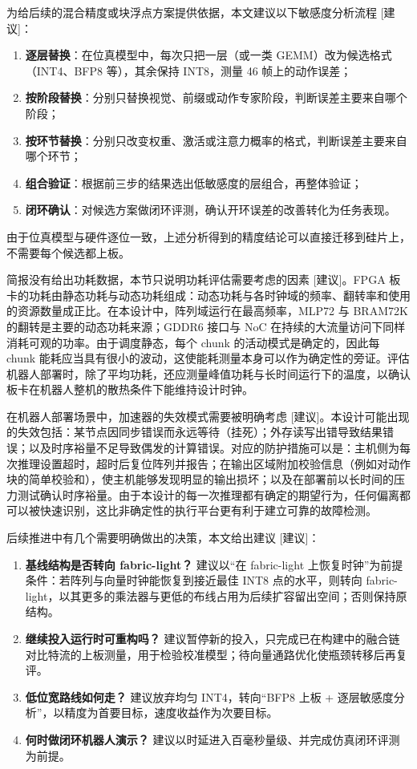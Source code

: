 \documentclass[a4paper,10.5pt]{ctexart}
\newcommand{\tR}{\textsf{[建议]}}           %
\begin{document}
为给后续的混合精度或块浮点方案提供依据，本文建议以下敏感度分析流程 \tR：
\begin{enumerate}
  \item \textbf{逐层替换}：在位真模型中，每次只把一层（或一类 GEMM）改为候选格式（INT4、BFP8 等），其余保持 INT8，测量 46 帧上的动作误差；
  \item \textbf{按阶段替换}：分别只替换视觉、前缀或动作专家阶段，判断误差主要来自哪个阶段；
  \item \textbf{按环节替换}：分别只改变权重、激活或注意力概率的格式，判断误差主要来自哪个环节；
  \item \textbf{组合验证}：根据前三步的结果选出低敏感度的层组合，再整体验证；
  \item \textbf{闭环确认}：对候选方案做闭环评测，确认开环误差的改善转化为任务表现。
\end{enumerate}
由于位真模型与硬件逐位一致，上述分析得到的精度结论可以直接迁移到硅片上，不需要每个候选都上板。

简报没有给出功耗数据，本节只说明功耗评估需要考虑的因素 \tR。FPGA 板卡的功耗由静态功耗与动态功耗组成：动态功耗与各时钟域的频率、翻转率和使用的资源数量成正比。在本设计中，阵列域运行在最高频率，MLP72 与 BRAM72K 的翻转是主要的动态功耗来源；GDDR6 接口与 NoC 在持续的大流量访问下同样消耗可观的功率。由于调度静态，每个 chunk 的活动模式是确定的，因此每 chunk 能耗应当具有很小的波动，这使能耗测量本身可以作为确定性的旁证。评估机器人部署时，除了平均功耗，还应测量峰值功耗与长时间运行下的温度，以确认板卡在机器人整机的散热条件下能维持设计时钟。

在机器人部署场景中，加速器的失效模式需要被明确考虑 \tR。本设计可能出现的失效包括：某节点因同步错误而永远等待（挂死）；外存读写出错导致结果错误；以及时序裕量不足导致偶发的计算错误。对应的防护措施可以是：主机侧为每次推理设置超时，超时后复位阵列并报告；在输出区域附加校验信息（例如对动作块的简单校验和），使主机能够发现明显的输出损坏；以及在部署前以长时间的压力测试确认时序裕量。由于本设计的每一次推理都有确定的期望行为，任何偏离都可以被快速识别，这比非确定性的执行平台更有利于建立可靠的故障检测。

后续推进中有几个需要明确做出的决策，本文给出建议 \tR：
\begin{enumerate}
  \item \textbf{基线结构是否转向 fabric-light？} 建议以“在 fabric-light 上恢复时钟”为前提条件：若阵列与向量时钟能恢复到接近最佳 INT8 点的水平，则转向 fabric-light，以其更多的乘法器与更低的布线占用为后续扩容留出空间；否则保持原结构。
  \item \textbf{继续投入运行时可重构吗？} 建议暂停新的投入，只完成已在构建中的融合链对比特流的上板测量，用于检验校准模型；待向量通路优化使瓶颈转移后再复评。
  \item \textbf{低位宽路线如何走？} 建议放弃均匀 INT4，转向“BFP8 上板 + 逐层敏感度分析”，以精度为首要目标，速度收益作为次要目标。
  \item \textbf{何时做闭环机器人演示？} 建议以时延进入百毫秒量级、并完成仿真闭环评测为前提。
\end{enumerate}
\end{document}
